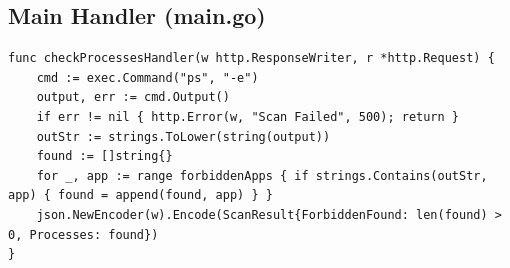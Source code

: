 \documentclass[12pt,a4paper]{article}
\begin{document}
\subsection{Main Handler (main.go)}
\begin{lstlisting}[basicstyle=\ttfamily\scriptsize]
func checkProcessesHandler(w http.ResponseWriter, r *http.Request) {
	cmd := exec.Command("ps", "-e")
	output, err := cmd.Output()
	if err != nil { http.Error(w, "Scan Failed", 500); return }
	outStr := strings.ToLower(string(output))
	found := []string{}
	for _, app := range forbiddenApps { if strings.Contains(outStr, app) { found = append(found, app) } }
	json.NewEncoder(w).Encode(ScanResult{ForbiddenFound: len(found) > 0, Processes: found})
}
\end{lstlisting}
\end{document}
